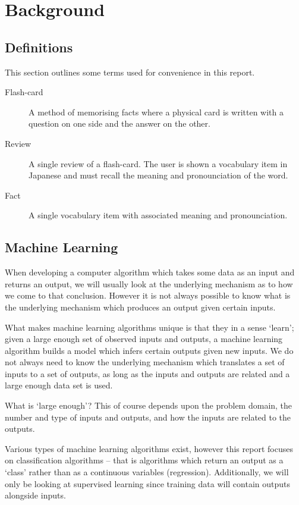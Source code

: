 \chapter{Background}
\label{background}
\section{Definitions}
This section outlines some terms used for convenience in this report.
\begin{description}
\item[Flash-card] A method of memorising facts where a physical card is written with a question on one side and the answer on the other.
\item[Review] A single review of a flash-card. The user is shown a vocabulary item in Japanese and must recall the meaning and pronounciation of the word. 
\item[Fact] A single vocabulary item with associated meaning and pronounciation.
\end{description}
\section{Machine Learning} \label{background_machinelearning}
When developing a computer algorithm which takes some data as an input and returns an output,
we will usually look at the underlying mechanism as to how we come to that conclusion. However it is not
always possible to know what is the underlying mechanism which produces an output
given certain inputs.

What makes machine learning algorithms unique is that they in a sense `learn'; given a large
enough set of observed inputs and outputs, a machine learning algorithm builds a model which infers
certain outputs given new inputs. We do not always need to know the underlying mechanism which
translates a set of inputs to a set of outputs, as long as the inputs and outputs are related and
a large enough data set is used.

What is `large enough'? This of course depends upon the problem domain, the number and type of inputs and outputs,
and how the inputs are related to the outputs. 

Various types of machine learning algorithms exist, however this report focuses on classification
algorithms -- that is algorithms which return an output as a `class' rather than as a continuous variables
(regression). Additionally, we will only be looking at supervised learning since training data will contain
outputs alongside inputs.

